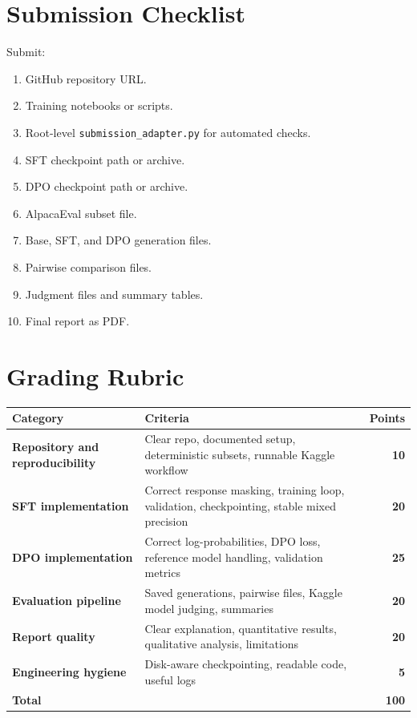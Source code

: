 \documentclass[11pt]{article}
\begin{document}
\section{Submission Checklist}
Submit:
\begin{enumerate}[leftmargin=*]
  \item GitHub repository URL.
  \item Training notebooks or scripts.
  \item Root-level \texttt{submission\_adapter.py} for automated checks.
  \item SFT checkpoint path or archive.
  \item DPO checkpoint path or archive.
  \item AlpacaEval subset file.
  \item Base, SFT, and DPO generation files.
  \item Pairwise comparison files.
  \item Judgment files and summary tables.
  \item Final report as PDF.
\end{enumerate}

\section{Grading Rubric}
\begin{center}
\renewcommand{\arraystretch}{1.18}
\begin{tabularx}{\textwidth}{>{\bfseries\color{DeepNavy}}p{} X >{\bfseries}r}
\rowcolor{MistBlue}
Category & Criteria & Points \\
\midrule
Repository and reproducibility & Clear repo, documented setup, deterministic subsets, runnable Kaggle workflow & 10 \\
SFT implementation & Correct response masking, training loop, validation, checkpointing, stable mixed precision & 20 \\
DPO implementation & Correct log-probabilities, DPO loss, reference model handling, validation metrics & 25 \\
Evaluation pipeline & Saved generations, pairwise files, Kaggle model judging, summaries & 20 \\
Report quality & Clear explanation, quantitative results, qualitative analysis, limitations & 20 \\
Engineering hygiene & Disk-aware checkpointing, readable code, useful logs & 5 \\
\midrule
\rowcolor{MistTeal}
Total & & 100 \\
\end{tabularx}
\end{center}
\end{document}
